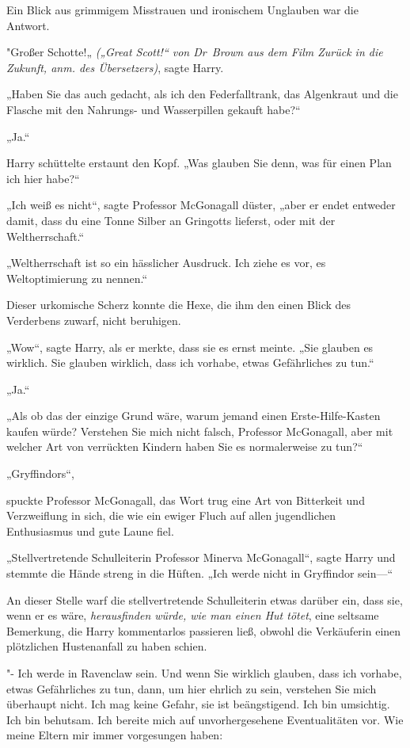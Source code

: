 {Ein Blick aus grimmigem Misstrauen und ironischem Unglauben war die Antwort.

"Großer Schotte!„ \emph{(„Great Scott!“ von Dr~Brown aus dem Film Zurück in die Zukunft, anm. des Übersetzers)}, sagte Harry.

„Haben Sie das auch gedacht, als ich den Federfalltrank, das Algenkraut und die Flasche mit den Nahrungs- und Wasserpillen gekauft habe?“

„Ja.“

Harry schüttelte erstaunt den Kopf. „Was glauben Sie denn, was für einen Plan ich hier habe?“

„Ich weiß es nicht“, sagte Professor McGonagall düster, „aber er endet entweder damit, dass du eine Tonne Silber an Gringotts lieferst, oder mit der Weltherrschaft.“

„Weltherrschaft ist so ein hässlicher Ausdruck. Ich ziehe es vor, es Weltoptimierung zu nennen.“

Dieser urkomische Scherz konnte die Hexe, die ihm den einen Blick des Verderbens zuwarf, nicht beruhigen.

„Wow“, sagte Harry, als er merkte, dass sie es ernst meinte. „Sie glauben es wirklich. Sie glauben wirklich, dass ich vorhabe, etwas Gefährliches zu tun.“

„Ja.“

„Als ob das der einzige Grund wäre, warum jemand einen Erste-Hilfe-Kasten kaufen würde? Verstehen Sie mich nicht falsch, Professor McGonagall, aber mit welcher Art von verrückten Kindern haben Sie es normalerweise zu tun?“

„Gryffindors“,

spuckte Professor McGonagall, das Wort trug eine Art von Bitterkeit und Verzweiflung in sich, die wie ein ewiger Fluch auf allen jugendlichen Enthusiasmus und gute Laune fiel.

„Stellvertretende Schulleiterin Professor Minerva McGonagall“, sagte Harry und stemmte die Hände streng in die Hüften. „Ich werde nicht in Gryffindor sein—“

An dieser Stelle warf die stellvertretende Schulleiterin etwas darüber ein, dass sie, wenn er es wäre, \emph{herausfinden würde, wie man einen Hut tötet}, eine seltsame Bemerkung, die Harry kommentarlos passieren ließ, obwohl die Verkäuferin einen plötzlichen Hustenanfall zu haben schien.

"- Ich werde in Ravenclaw sein. Und wenn Sie wirklich glauben, dass ich vorhabe, etwas Gefährliches zu tun, dann, um hier ehrlich zu sein, verstehen Sie mich überhaupt nicht. Ich mag keine Gefahr, sie ist beängstigend. Ich bin umsichtig. Ich bin behutsam. Ich bereite mich auf unvorhergesehene Eventualitäten vor. Wie meine Eltern mir immer vorgesungen haben:

}
